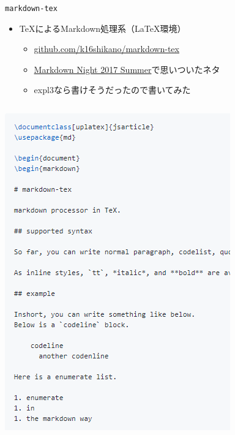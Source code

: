 \documentclass[14pt,dvipdfmx,uplatex]{beamer}
\begin{document}
\begin{frame}[t]{\inhibitglue \texttt{markdown-tex}}
  \sffamily
  \begin{itemize}
    \item \TeX によるMarkdown処理系（\LaTeX 環境）
    \begin{itemize}
      \item \href{https://github.com/k16shikano/markdown-tex}{github.com/k16shikano/markdown-tex}
      \item \href{https://connpass.com/event/63383/}{Markdown Night 2017 Summer}で思いついたネタ
      \item expl3なら書けそうだったので書いてみた
    \end{itemize}
  \end{itemize}
  \begin{center}
    \begin{columns}[c]
      \begin{column}{.4\textwidth}
      \includegraphics[width=\textwidth]{figures/mdtex-input.png}

\end{column}
\end{columns}
\end{center}
\end{frame}
\end{document}
